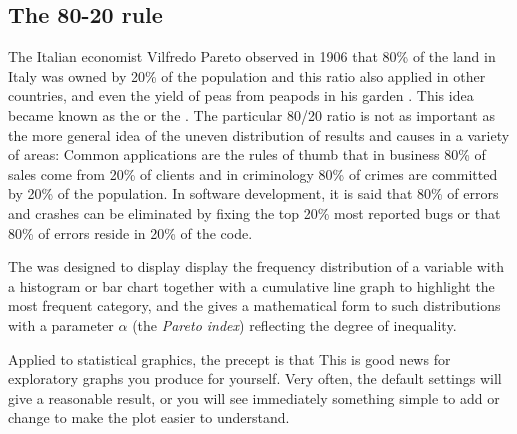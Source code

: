\documentclass[11pt]{book}
\begin{document}
\subsection{The 80-20 rule}
The Italian economist Vilfredo Pareto observed in 1906 that 80\% of the land in Italy was
owned by 20\% of the population and this ratio also applied in other countries,
and even the yield of peas from peapods in his garden \citep{Pareto:1971}.
This idea became known as the 
 or the .  
The particular 80/20 ratio is not as important as the more general idea of the
uneven distribution of results and causes in a variety of areas:
Common applications are the rules of thumb that in business 80\% of sales come
from 20\% of clients
and in criminology 80\% of crimes are committed by 20\%
of the population.  In software development, it is said that
80\% of errors and crashes can be eliminated by fixing the top 20\% most reported bugs
or that 80\% of errors reside in 20\% of the code.

The  was designed to display display the frequency distribution of
a variable with a histogram or bar chart together with a cumulative line graph
to highlight the most frequent category, and the 
gives a mathematical form to such distributions with a parameter $\alpha$
(the \emph{Pareto index})
reflecting the degree of inequality.

Applied to statistical graphics, the precept is that 
This is good news for exploratory
graphs you produce for yourself.  Very often, the default settings will give a reasonable
result, or you will see immediately something simple to add or change to make the plot
easier to understand.
\end{document}
